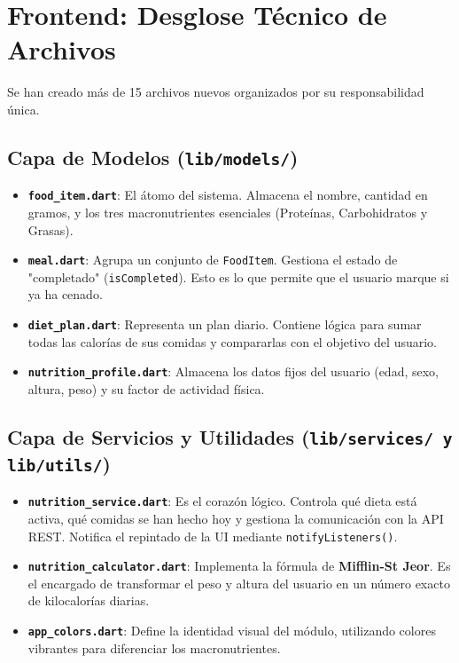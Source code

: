 \documentclass[12pt,a4paper]{article}
\begin{document}
\section{Frontend: Desglose Técnico de Archivos}
Se han creado más de 15 archivos nuevos organizados por su responsabilidad única.

\subsection{Capa de Modelos (\texttt{lib/models/})}
\begin{itemize}
    \item \textbf{\texttt{food\_item.dart}}: El átomo del sistema. Almacena el nombre, cantidad en gramos, y los tres macronutrientes esenciales (Proteínas, Carbohidratos y Grasas).
    \item \textbf{\texttt{meal.dart}}: Agrupa un conjunto de \texttt{FoodItem}. Gestiona el estado de "completado" (\texttt{isCompleted}). Esto es lo que permite que el usuario marque si ya ha cenado.
    \item \textbf{\texttt{diet\_plan.dart}}: Representa un plan diario. Contiene lógica para sumar todas las calorías de sus comidas y compararlas con el objetivo del usuario.
    \item \textbf{\texttt{nutrition\_profile.dart}}: Almacena los datos fijos del usuario (edad, sexo, altura, peso) y su factor de actividad física.
\end{itemize}

\subsection{Capa de Servicios y Utilidades (\texttt{lib/services/ y lib/utils/})}
\begin{itemize}
    \item \textbf{\texttt{nutrition\_service.dart}}: Es el corazón lógico. Controla qué dieta está activa, qué comidas se han hecho hoy y gestiona la comunicación con la API REST. Notifica el repintado de la UI mediante \texttt{notifyListeners()}.
    \item \textbf{\texttt{nutrition\_calculator.dart}}: Implementa la fórmula de \textbf{Mifflin-St Jeor}. Es el encargado de transformar el peso y altura del usuario en un número exacto de kilocalorías diarias.
    \item \textbf{\texttt{app\_colors.dart}}: Define la identidad visual del módulo, utilizando colores vibrantes para diferenciar los macronutrientes.
\end{itemize}
\end{document}
